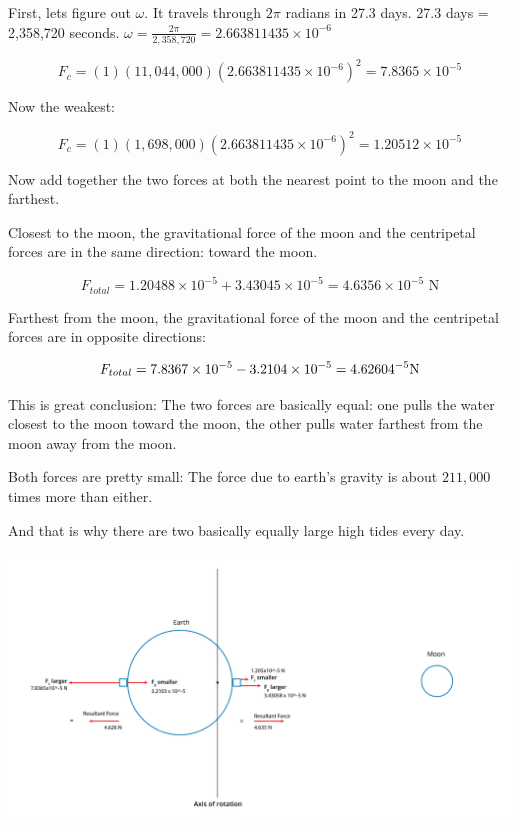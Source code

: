 \begin{Answer}[ref=life-orbits5]

First,  lets figure out $\omega$.   It travels through $2\pi$ radians in 27.3 days.  27.3 days = 2,358,720 seconds.    $\omega = \frac{2\pi}{2,358,720} = 2.663811435 \times 10^{-6}$

$$F_c = (1)(11,044,000)(2.663811435 \times 10^{-6})^2 = 7.8365 \times 10^{-5}$$

Now the weakest:

$$F_c = (1)(1,698,000)(2.663811435 \times 10^{-6})^2 = 1.20512 \times 10^{-5}$$

\end{Answer}


\begin{Exercise}[title={Life Among the Orbits 6: Net  Force}, label=life-orbits6]

Now add together the two forces at both the nearest point to the moon and the farthest.

\end{Exercise}

\begin{Answer}[ref=life-orbits6]

Closest to the moon,   the gravitational force of the moon and the centripetal forces are in the same direction: toward the moon.

$$F_{total} = 1.20488 \times 10^{-5} + 3.43045 \times 10^{-5} = 4.6356 \times 10^{-5} \text{ N}$$

Farthest from the moon,  the gravitational force of the moon and the centripetal forces are in opposite directions:

$$F_{total} = 7.8367 \times 10^{-5} - 3.2104 \times 10^{-5} = 4.62604 \time 10^{-5} \text{N}$$

This is great conclusion:  The two forces are basically equal: one pulls the water closest to the moon toward the moon,  the other pulls water farthest from the moon away from the moon.

Both forces are pretty small:  The force due to earth's gravity is about $211,000$ times more than either.

And that is why there are two basically equally large high tides every day.

\includegraphics[width=.5\textwidth]{tidesSolution.png}

\end{Answer}


